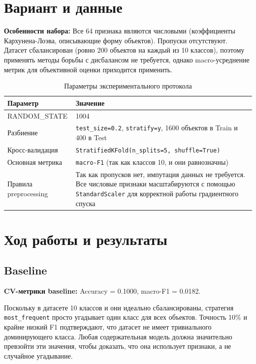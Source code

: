 \documentclass[oneside,a4paper,14pt]{extarticle}
\begin{document}
\section{Вариант и данные}
\textbf{Особенности набора:} Все 64 признака являются  числовыми (коэффициенты Кархунена-Лоэва, описывающие форму объектов). Пропуски отсутствуют. Датасет сбалансирован (ровно 200 объектов на каждый из 10 классов), поэтому применять методы борьбы с дисбалансом не требуется, однако macro-усреднение метрик для объективной оценки приходится применить.


\begin{table}[h!]
  \centering
  \label{tab:protocol}
  \begin{tabular}{|l|p{9cm}|}
    \hline
    \textbf{Параметр} & \textbf{Значение} \\
    \hline
    RANDOM\_STATE & 1004 \\
    \hline
    Разбиение & \texttt{test\_size=0.2}, \texttt{stratify=y}, 
                 1600 объектов в Train и 400 в Test \\
    \hline
    Кросс-валидация & \texttt{StratifiedKFold(n\_splits=5, shuffle=True)} \\
    \hline
    Основная метрика & \texttt{macro-F1} (так как классов 10, и они равнозначны) \\
    \hline
    Правила preprocessing & Так как пропусков нет, импутация данных 
                             не требуется. Все числовые признаки масштабируются 
                             с помощью \texttt{StandardScaler} для корректной 
                             работы градиентного спуска \\
    \hline
  \end{tabular}
   \caption{Параметры экспериментального протокола} 
\end{table}


\newpage
\section{Ход работы и результаты}

\subsection{Baseline}
\textbf{CV-метрики baseline:} Accuracy = 0.1000, macro-F1 = 0.0182. 

Поскольку в датасете 10 классов и они идеально сбалансированы, стратегия \texttt{most\_frequent} просто угадывает один класс для всех объектов. Точность 10\% и крайне низкий F1 подтверждают, что датасет не имеет тривиального доминирующего класса. Любая содержательная модель должна значительно превзойти эти значения, чтобы доказать, что она использует признаки, а не случайное угадывание.
\end{document}
